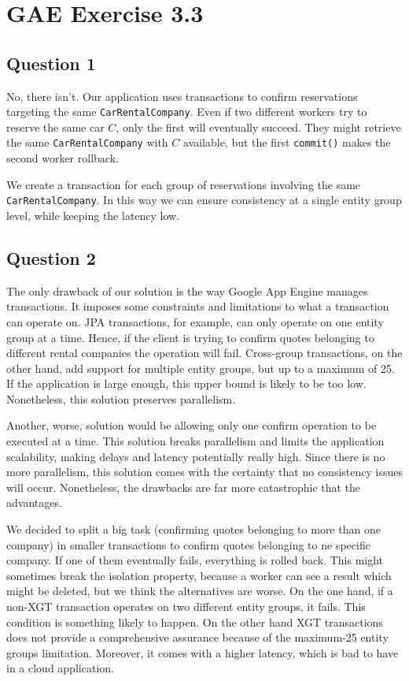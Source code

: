 \section{GAE Exercise 3.3}
\subsection{Question 1}
No, there isn't. Our application uses transactions to confirm reservations targeting the same \texttt{CarRentalCompany}. Even if two different workers try to reserve the same car $C$, only the first will eventually succeed. They might retrieve the same \texttt{CarRentalCompany} with $C$ available, but the first \texttt{commit()} makes the second worker rollback. 

We create a transaction for each group of reservations involving the same \texttt{CarRentalCompany}. In this way we can ensure consistency at a single entity group level, while keeping the latency low.

\subsection{Question 2}
The only drawback of our solution is the way Google App Engine manages transactions. It imposes some constraints and limitations to what a transaction can operate on. JPA transactions, for example, can only operate on one entity group at a time. Hence, if the client is trying to confirm quotes belonging to different rental companies the operation will fail. Cross-group transactions, on the other hand, add support for multiple entity groups, but up to a maximum of 25. If the application is large enough, this upper bound is likely to be too low. Nonetheless, this solution preserves parallelism.

Another, worse, solution would be allowing only one confirm operation to be executed at a time. This solution breaks parallelism and limits the application scalability, making delays and latency potentially really high. Since there is no more parallelism, this solution comes with the certainty that no consistency issues will occur. Nonetheless, the drawbacks are far more catastrophic that the advantages. 

We decided to split a big task (confirming quotes belonging to more than one company) in smaller transactions to confirm quotes belonging to ne specific company. If one of them eventually fails, everything is rolled back. This might sometimes break the isolation property, because a worker can see a result which might be deleted, but we think the alternatives are worse. On the one hand, if a non-XGT transaction operates on two different entity groups, it fails. This condition is something likely to happen. On the other hand XGT transactions does not provide a comprehensive assurance because of the maximum-25 entity groups limitation. Moreover, it comes with a higher latency, which is bad to have in a cloud application.

